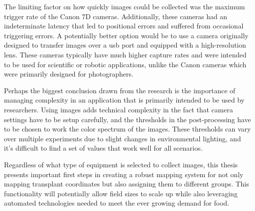 The limiting factor on how quickly images could be collected was the maximum trigger rate of the Canon 7D cameras.  Additionally, these cameras had an indeterminate latency that led to positional errors and suffered from occasional triggering errors.  A potentially better option would be to use a camera originally designed to transfer images over a \acf{usb} port and equipped with a high-resolution lens.  These cameras typically have much higher capture rates and were intended to be used for scientific or robotic applications, unlike the Canon cameras which were primarily designed for photographers. 

Perhaps the biggest conclusion drawn from the research is the importance of managing complexity in an application that is primarily intended to be used by researchers.  Using images adds technical complexity in the fact that camera settings have to be setup carefully, and the thresholds in the post-processing have to be chosen to work the color spectrum of the images.  These thresholds can vary over multiple experiments due to slight changes in environmental lighting, and it's difficult to find a set of values that work well for all scenarios.     

Regardless of what type of equipment is selected to collect images, this thesis presents important first steps in creating a robust mapping system for not only mapping transplant coordinates but also assigning them to different groups. This functionality will potentially allow field sizes to scale up while also leveraging automated technologies needed to meet the ever growing demand for food.
